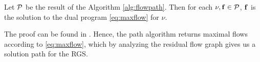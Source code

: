 \begin{theorem}
\label{thm:main}
Let $\mathcal{P}$ be the result of the Algorithm \ref{alg:flowpath}.
Then for each $\nu, \mathbf{f} \in \mathcal{P}$, $\mathbf{f}$ is the solution to the dual program \eqref{eq:maxflow} for $\nu$. 
\end{theorem}

The proof can be found in \cite{sharpnack2013path}.
Hence, the path algorithm returns maximal flows according to \eqref{eq:maxflow}, which by analyzing the residual flow graph gives us a solution path for the RGS.

